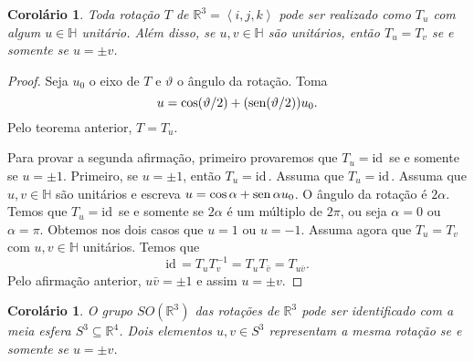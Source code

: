 \documentclass[12pt]{amsart}
\newcommand{\Ha}{\mathbb H}
\newcommand{\R}{\mathbb R}
\newcommand{\id}{\mbox{id}\,}
\DeclareMathOperator{\sen}{\textrm{\rm sen}}
\newtheorem{corollary}[theorem]{Corolário}
\theoremstyle{definition}
\begin{document}
\begin{corollary}
    Toda rotação $T$ de $\R^3=\left<i,j,k\right>$ pode ser realizado como $T_u$ com algum $u\in\Ha$ unitário. 
    Além disso, se $u,v\in\Ha$ são unitários, então $T_u=T_v$ se e somente se $u=\pm v$. 
\end{corollary}
\begin{proof}
    Seja $u_0$ o eixo de $T$ e $\vartheta$ o ângulo da rotação. Toma 
    \[
        u=\cos(\vartheta/2)+(\sen(\vartheta/2))u_0.
    \] 
    Pelo teorema anterior, $T=T_{u}$.

    Para provar a segunda afirmação, primeiro provaremos que $T_u=\id$ se e somente se 
    $u=\pm 1$. Primeiro, se $u=\pm 1$, então $T_u=\id$. Assuma que $T_u=\id$. 
    Assuma que $u,v\in\Ha$ são unitários e escreva $u=\cos\alpha+\sen\alpha u_0$. 
    O ângulo da rotação é $2\alpha$. Temos que $T_u=\id$ se e somente se $2\alpha$ 
    é um múltiplo de $2\pi$, ou seja $\alpha=0$ ou $\alpha=\pi$. Obtemos nos dois casos
    que $u=1$ ou $u=-1$. Assuma agora que $T_u=T_v$ com $u,v\in\Ha$ unitários. 
    Temos que 
    \[
        \id =T_uT_v^{-1}=T_uT_{\bar v}=T_{u\bar v}.
    \]
    Pelo afirmação anterior, $u\bar v=\pm 1$ e assim $u=\pm v$. 
\end{proof}

\begin{corollary}
    O grupo $SO(\R^3)$ das rotações de $\R^3$ pode ser identificado com a meia esfera $S^3\subseteq \R^4$. 
    Dois elementos $u,v\in S^3$ representam a mesma rotação se e somente se $u=\pm v$. 
\end{corollary}
\end{document}
